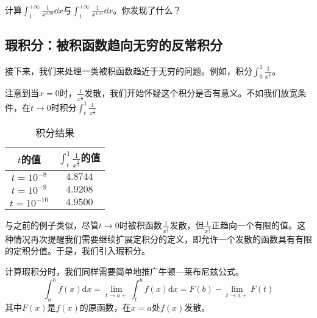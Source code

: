 \begin{exercise}{}
计算$\int^{+\infty}_1 \frac{1}{x^{0.99}} \dd x$与$\int^{+\infty}_1 \frac{1}{x^{1.01}} \dd x$。你发现了什么？
\end{exercise}

\subsection{瑕积分：被积函数趋向无穷的反常积分}
接下来，我们来处理一类被积函数趋近于无穷的问题。例如，积分$\int_0^1 \frac{1}{x^{\frac{4}{5}}}$。

注意到当$x=0$时，$\frac{1}{x^{\frac{4}{5}}}$发散，我们开始怀疑这个积分是否有意义。不如我们放宽条件，在$t\to0$时积分$\int_t^1 \frac{1}{x^{\frac{4}{5}}}$

\begin{table}[ht]
\centering
\caption{积分结果}\label{impro_tab2}
\begin{tabular}{|c|c|}
\hline
$t$的值 & $\int_t^1 \frac{1}{x^{\frac{4}{5}}}$的值 \\
\hline
$t=10^{-8}$ & $4.8744$ \\
\hline
$t=10^{-9}$  & $4.9208$ \\
\hline
$t=10^{-10}$  & $4.9500$ \\
\hline
\end{tabular}
\end{table}
与之前的例子类似，尽管$t\to0$时被积函数$\frac{1}{x^{\frac{4}{5}}}$发散，但$\frac{1}{x^{\frac{4}{5}}}$正趋向一个有限的值。这种情况再次提醒我们需要继续扩展定积分的定义，即允许一个发散的函数具有有限的定积分值。于是，我们引入瑕积分。

计算瑕积分时，我们同样需要简单地推广牛顿—莱布尼兹公式。
\begin{equation}
\displaystyle \int ^{b}_a f(x)\mathrm{d} x=\lim_{t\rightarrow a+}\int _t^{b}f(x)\mathrm{d} x
= F(b) - \lim_{t\rightarrow a+ }F(t)
\end{equation}
其中$F(x)$是$f(x)$的原函数，在$x=a$处$f(x)$发散。